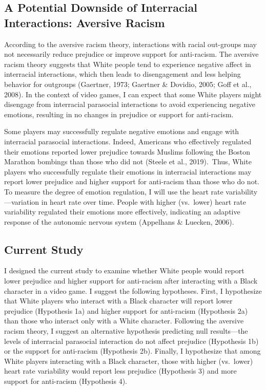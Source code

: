 \documentclass[
  english,
  man, noextraspace,floatsintext]{apa6}
\begin{document}
\hypertarget{a-potential-downside-of-interracial-interactions-aversive-racism}{%
\subsection{A Potential Downside of Interracial Interactions: Aversive Racism}\label{a-potential-downside-of-interracial-interactions-aversive-racism}}

According to the aversive racism theory, interactions with racial out-groups may not necessarily reduce prejudice or improve support for anti-racism. The aversive racism theory suggests that White people tend to experience negative affect in interracial interactions, which then leads to disengagement and less helping behavior for outgroups (Gaertner, 1973; Gaertner \& Dovidio, 2005; Goff et al., 2008). In the context of video games, I can expect that some White players might disengage from interracial parasocial interactions to avoid experiencing negative emotions, resulting in no changes in prejudice or support for anti-racism.~

Some players may successfully regulate negative emotions and engage with interracial parasocial interactions. Indeed, Americans who effectively regulated their emotions reported lower prejudice towards Muslims following the Boston Marathon bombings than those who did not (Steele et al., 2019).~Thus, White players who successfully regulate their emotions in interracial interactions may report lower prejudice and higher support for anti-racism than those who do not. To measure the degree of emotion regulation, I will use the heart rate variability---variation in heart rate over time. People with higher (vs.~lower) heart rate variability regulated their emotions more effectively, indicating an adaptive response of the autonomic nervous system (Appelhans \& Luecken, 2006).

\hypertarget{current-study}{%
\subsection{Current Study}\label{current-study}}

I designed the current study to examine whether White people would report lower prejudice and higher support for anti-racism after interacting with a Black character in a video game. I suggest the following hypotheses. First, I hypothesize that White players who interact with a Black character will report lower prejudice (Hypothesis 1a) and higher support for anti-racism (Hypothesis 2a) than those who interact only with a White character. Following the aversive racism theory, I suggest an alternative hypothesis predicting null results---the levels of interracial parasocial interaction do not affect prejudice (Hypothesis 1b) or the support for anti-racism (Hypothesis 2b). Finally, I hypothesize that among White players interacting with a Black character, those with higher (vs.~lower) heart rate variability would report less prejudice (Hypothesis 3) and more support for anti-racism (Hypothesis 4).
\end{document}
